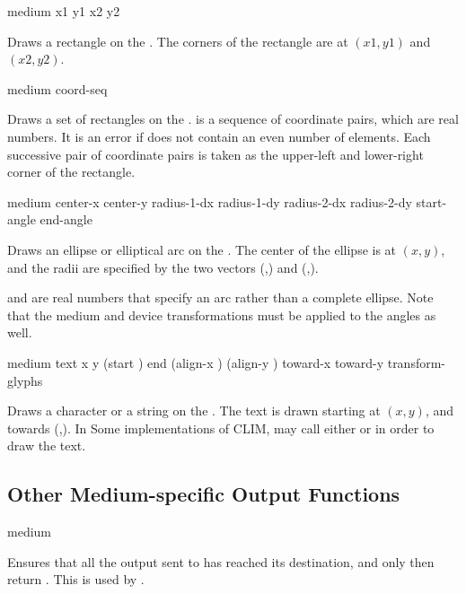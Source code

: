  {medium x1 y1 x2 y2}

Draws a rectangle on the  .  The corners of the
rectangle are at $(x1,y1)$ and $(x2,y2)$.

 {medium coord-seq}

Draws a set of rectangles on the  .   is
a sequence of coordinate pairs, which are real numbers.  It is an error if
 does not contain an even number of elements.  Each successive
pair of coordinate pairs is taken as the upper-left and lower-right corner of
the rectangle.

 {medium center-x center-y 
                                    radius-1-dx radius-1-dy radius-2-dx radius-2-dy  
                                    start-angle end-angle}


Draws an ellipse or elliptical arc on the  .  The
center of the ellipse is at $(x,y)$, and the radii are specified by the two
vectors (,) and
(,).

 and  are real numbers that specify an arc
rather than a complete ellipse.  Note that the medium and device transformations
must be applied to the angles as well.

 {medium text x y
                                 (start ) end
                                 (align-x ) (align-y )
                                 toward-x toward-y transform-glyphs}

Draws a character or a string on the  .  The text is
drawn starting at $(x,y)$, and towards (,).  In Some
implementations of CLIM,  may call either
 or  in order to draw the
text.

\subsection {Other Medium-specific Output Functions}

 {medium}

Ensures that all the output sent to  has reached its destination,
and only then return .  This is used by .

